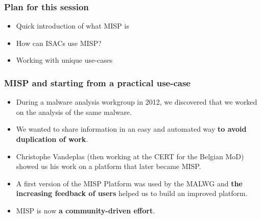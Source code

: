 
\begin{frame}[t,plain]
\titlepage
\end{frame}

\begin{frame}
	\frametitle{Plan for this session}
	\begin{itemize}
		\item Quick introduction of what MISP is
                \item How can ISACs use MISP?
                \item Working with unique use-cases
	\end{itemize}
\end{frame}

\begin{frame}
 \frametitle{MISP and starting from a practical use-case}
 \begin{itemize}
         \item During a malware analysis workgroup in 2012, we discovered that we worked on the analysis of the same malware.
         \item We wanted to share information in an easy and automated way {\bf to avoid duplication of work}.
         \item Christophe Vandeplas (then working at the CERT for the Belgian MoD) showed us his work on a platform that later became MISP.
         \item A first version of the MISP Platform was used by the MALWG and {\bf the increasing feedback of users} helped us to build an improved platform.
         \item MISP is now {\bf a community-driven effort}.
 \end{itemize}
\end{frame}

